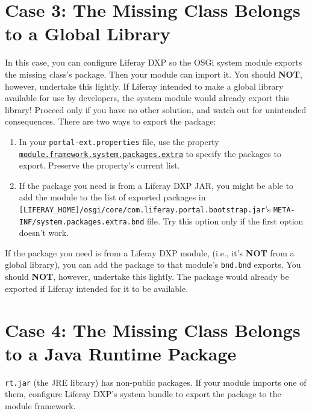\section{Case 3: The Missing Class Belongs to a Global
Library}\label{case-3-the-missing-class-belongs-to-a-global-library}

In this case, you can configure Liferay DXP so the OSGi system module
exports the missing class's package. Then your module can import it. You
should \textbf{NOT}, however, undertake this lightly. If Liferay
intended to make a global library available for use by developers, the
system module would already export this library! Proceed only if you
have no other solution, and watch out for unintended consequences. There
are two ways to export the package:

\begin{enumerate}
\def\labelenumi{\arabic{enumi}.}
\item
  In your \texttt{portal-ext.properties} file, use the property
  \href{https://docs.liferay.com/dxp/portal/7.2-latest/propertiesdoc/portal.properties.html\#Module\%20Framework}{\texttt{module.framework.system.packages.extra}}
  to specify the packages to export. Preserve the property's current
  list.
\item
  If the package you need is from a Liferay DXP JAR, you might be able
  to add the module to the list of exported packages in
  \texttt{{[}LIFERAY\_HOME{]}/osgi/core/com.liferay.portal.bootstrap.jar}'s
  \texttt{META-INF/system.packages.extra.bnd} file. Try this option only
  if the first option doesn't work.
\end{enumerate}

If the package you need is from a Liferay DXP module, (i.e., it's
\textbf{NOT} from a global library), you can add the package to that
module's \texttt{bnd.bnd} exports. You should \textbf{NOT}, however,
undertake this lightly. The package would already be exported if Liferay
intended for it to be available.

\section{Case 4: The Missing Class Belongs to a Java Runtime
Package}\label{case-4-the-missing-class-belongs-to-a-java-runtime-package}

\texttt{rt.jar} (the JRE library) has non-public packages. If your
module imports one of them, configure Liferay DXP's system bundle to
export the package to the module framework.

